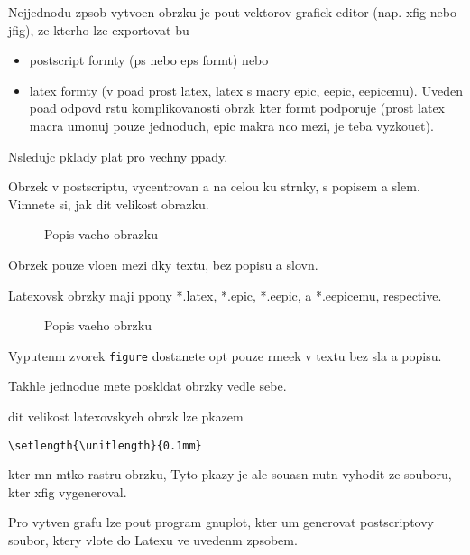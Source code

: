 \documentclass[12pt]{article}
\begin{document}
Nejjednodu zpsob vytvoen obrzku je pout vektorov grafick
editor (nap. xfig nebo jfig), ze kterho lze exportovat bu
\begin{itemize}
\item postscript formty (ps nebo eps formt) nebo
\item latex formty (v poad prost latex, latex s macry epic, eepic, eepicemu). Uveden poad odpovd rstu
komplikovanosti obrzk kter formt podporuje (prost latex macra
umonuj pouze jednoduch, epic makra nco mezi, je teba
vyzkouet).

\end{itemize}
Nsledujc pklady plat pro vechny ppady.

Obrzek v postscriptu, vycentrovan a na celou ku strnky, s
popisem a slem. Vimnete si, jak dit velikost obrazku.
\begin{figure}[ht]
\epsfysize=3cm \centerline{} \caption{Popis
vaeho obrazku} \label{labelvasehoobrazku}
\end{figure}

Obrzek pouze vloen mezi dky textu, bez popisu a slovn.\\
\epsfxsize=1cm
\rule{0pt}{0pt}\hfill{}\hfill\rule{0pt}{0pt}

Latexovsk obrzky maji ppony *.latex, *.epic, *.eepic, a
*.eepicemu, respective.
\begin{figure}[ht]
\begin{center}

\end{center}
\caption{Popis vaeho obrzku} \label{l1}
\end{figure}
Vyputenm zvorek {\tt figure} dostanete opt pouze rmeek v textu
bez sla a popisu.

Takhle jednodue mete poskldat obrzky vedle sebe.
\begin{center}
\setlength{\unitlength}{0.1mm}
\hglue 5mm
\setlength{\unitlength}{0.15mm}
\hglue 5mm
\setlength{\unitlength}{0.2mm}
\end{center}
dit velikost latexovskych obrzk lze pkazem
\begin{verbatim}
\setlength{\unitlength}{0.1mm}
\end{verbatim}
kter mn mtko rastru obrzku, Tyto pkazy je ale souasn
nutn vyhodit ze souboru, kter xfig vygeneroval.

Pro vytven grafu lze pout program gnuplot, kter um generovat
postscriptovy soubor, ktery vlote do Latexu ve uvedenm
zpsobem.
\end{document}
